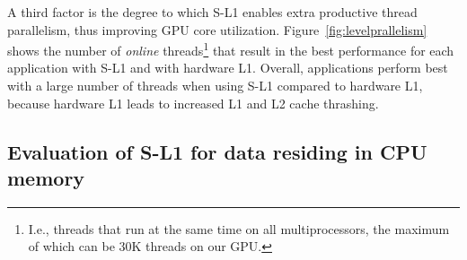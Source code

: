 A third factor is the degree to which S-L1 enables extra productive thread parallelism, thus improving GPU core utilization.
Figure~\ref{fig:levelprallelism} shows the number of \emph{online} threads\footnote{
    I.e., threads that run at the same time on all multiprocessors, the maximum of which can be 30K threads on our GPU.}
that result in the best performance for each application with S-L1 and with hardware L1.
Overall, applications perform best with a large number of threads when using S-L1 compared to hardware L1,
because hardware L1 leads to increased L1 and L2 cache thrashing. 






\subsection{Evaluation of S-L1 for data residing in CPU memory}

